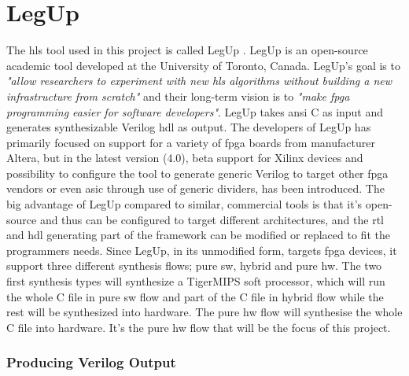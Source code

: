 \section{LegUp}
The \gls{hls} tool used in this project is called LegUp \cite{canis2011legup}. LegUp is an open-source academic tool developed at the University of Toronto, Canada. LegUp's goal is to \textit{"allow researchers to experiment with new \gls{hls} algorithms without building a new infrastructure from scratch"} and their long-term vision is to \textit{"make \gls{fpga} programming easier for software developers"}. LegUp takes \acrshort{ansi} C as input and generates synthesizable Verilog \gls{hdl} as output. The developers of LegUp has primarily focused on support for a variety of \gls{fpga} boards from manufacturer Altera, but in the latest version (4.0), beta support for Xilinx devices and possibility to configure the tool to generate generic Verilog to target other \gls{fpga} vendors or even \gls{asic} through use of generic dividers, has been introduced. The big advantage of LegUp compared to similar, commercial tools is that it's open-source and thus can be configured to target different architectures, and the \gls{rtl} and \gls{hdl} generating part of the framework can be modified or replaced to fit the programmers needs.
Since LegUp, in its unmodified form, targets \gls{fpga} devices, it support three different synthesis flows; pure \gls{sw}, hybrid and pure \gls{hw}. The two first synthesis types will synthesize a TigerMIPS \cite{tigmips} soft processor, which will run the whole C file in pure \gls{sw} flow and part of the C file in hybrid flow while the rest will be synthesized into hardware. The pure \gls{hw} flow will synthesise the whole C file into hardware. It's the pure \gls{hw} flow that will be the focus of this project.

\subsubsection{Producing Verilog Output}


